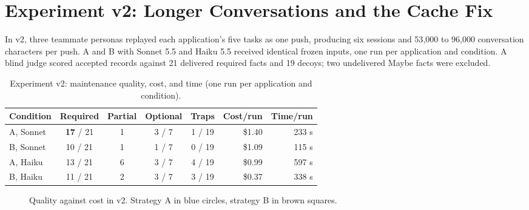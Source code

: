 \section{Experiment v2: Longer Conversations and the Cache Fix}
\label{sec:v2}

In v2, three teammate personas replayed each application's five tasks as one push, producing six sessions and 53{,}000 to 96{,}000 conversation characters per push. A and B with Sonnet 5.5 and Haiku 5.5 received identical frozen inputs, one run per application and condition. A blind judge scored accepted records against 21 delivered required facts and 19 decoys; two undelivered Maybe facts were excluded.

\begin{table}[htbp]
\centering
\caption{Experiment v2: maintenance quality, cost, and time (one run per application and condition).}
\label{tab:v2}
\small
\begin{tabular}{@{}lccccrr@{}}
\toprule
Condition & Required & Partial & Optional & Traps & Cost/run & Time/run \\
\midrule
A, Sonnet & \textbf{17} / 21 & 1 & 3 / 7 & 1 / 19 & \$1.40 & 233 s \\
B, Sonnet & 10 / 21 & 1 & 1 / 7 & 0 / 19 & \$1.09 & 115 s \\
A, Haiku & 13 / 21 & 6 & 3 / 7 & 4 / 19 & \$0.99 & 597 s \\
B, Haiku & 11 / 21 & 2 & 3 / 7 & 3 / 19 & \$0.37 & 338 s \\
\bottomrule
\end{tabular}
\end{table}

\begin{figure}[htbp]
\centering
{}
\caption{Quality against cost in v2. Strategy A in blue circles, strategy B in brown squares.}
\label{fig:v2scatter}
\end{figure}

